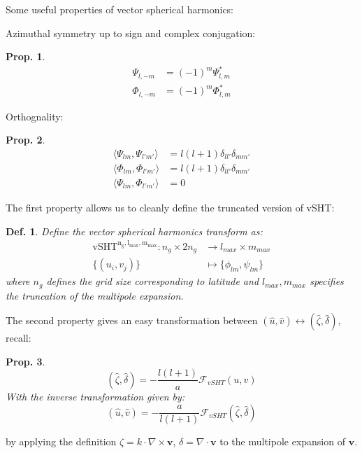 \documentclass[14pt]{extarticle}
\newenvironment{tbox}{
    \begin{tcolorbox}[colframe=white,sharp corners]
    
}{
    \end{tcolorbox}
}
\newtheorem{prop}{Prop.}
\newtheorem{df}{Def.}
\begin{document}
Some useful properties of vector spherical harmonics:
\begin{tbox}
    Azimuthal symmetry up to sign and complex conjugation:
    \begin{prop}
        \begin{align}
            \Psi_{l,-m} &= (-1)^m \Psi_{l,m}^* \\
            \Phi_{l,-m} &= (-1)^m \Phi_{l,m}^*
        \end{align}
    \end{prop}
    Orthognality:
    \begin{prop}
        \begin{align}
            \langle \Psi_{lm}, \Psi_{l'm'}\rangle  &= l(l+1)\delta_{ll'}\delta_{mm'} \\
            \langle \Phi_{lm}, \Phi_{l'm'}\rangle  &= l(l+1)\delta_{ll'}\delta_{mm'} \\
            \langle \Psi_{lm}, \Phi_{l'm'} \rangle &= 0 
        \end{align}
    \end{prop}
\end{tbox}
The first property allows us to cleanly define the truncated version of vSHT:
\begin{tbox}
    \begin{df}
        Define the vector spherical harmonics transform as: 
        \begin{align}
            \mathrm{vSHT^{n_g,l_{max},m_{max}}}: n_g\times 2n_g &\to l_{max}\times m_{max} \\
            \{(u_i, v_j)\}& \mapsto \{\phi_{lm},\psi_{lm}\}
        \end{align}
        where $n_g$ defines the grid size corresponding to latitude and $l_{max}, m_{max}$ specifies the truncation 
        of the multipole expansion.
    \end{df}
\end{tbox}
The second property gives an easy transformation between $(\hat u, \hat v)\leftrightarrow (\hat \zeta, \hat \delta)$, recall:
\begin{tbox}
    \begin{prop}
        $$(\hat \zeta, \hat \delta) = -\frac{l(l+1)}{a}\mathcal{F}_{vSHT}(u,v)$$
        With the inverse transformation given by:
        $$(\hat u, \hat v) = -\frac{a}{l(l+1)}\mathcal{F}_{vSHT}(\hat \zeta, \hat \delta)$$
    \end{prop}
\end{tbox}
by applying the definition $\zeta = k \cdot \nabla \times \mathbf{v}$, $\delta = \nabla \cdot \mathbf{v}$ to the multipole expansion of 
$\mathbf{v}$. 
\end{document}
